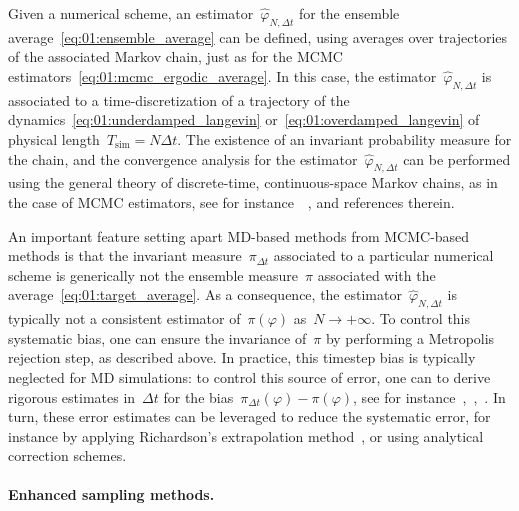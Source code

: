 Given a numerical scheme, an estimator~$\widehat{\varphi}_{N,\Delta t}$ for the ensemble average~\eqref{eq:01:ensemble_average} can be defined, using averages over trajectories of the associated Markov chain, just as for the MCMC estimators~\eqref{eq:01:mcmc_ergodic_average}.
In this case, the estimator~$\widehat{\varphi}_{N,\Delta t}$ is associated to a time-discretization of a trajectory of the dynamics~\eqref{eq:01:underdamped_langevin} or~\eqref{eq:01:overdamped_langevin} of physical length~$T_{\mathrm{sim}}=N\Delta t$.
The existence of an invariant probability measure for the chain, and the convergence analysis for the estimator~$\widehat{\varphi}_{N,\Delta t}$ can be performed using the general theory of discrete-time, continuous-space Markov chains, as in the case of MCMC estimators, see for instance~\cite[Section 6]{MSH02}~\cite{LMS16}, and references therein.

An important feature setting apart MD-based methods from MCMC-based methods is that the invariant measure~$\pi_{\Delta t}$ associated to a particular numerical scheme is generically not the ensemble measure~$\pi$ associated with the average~\eqref{eq:01:target_average}.
As a consequence, the estimator~$\widehat{\varphi}_{N,\Delta t}$ is typically not a consistent estimator of~$\pi(\varphi)$ as~$N\to +\infty$.
To control this systematic bias, one can ensure the invariance of~$\pi$ by performing a Metropolis rejection step, as described above. In practice, this timestep bias is typically neglected for MD simulations: to control this source of error, one can to derive rigorous estimates in~$\Delta t$ for the bias~$\pi_{\Delta t}(\varphi)-\pi(\varphi)$, see for instance~\cite{TT90},~\cite[Section 3.2.3]{LS16},~\cite[Section 2.4]{LMS16}.
In turn, these error estimates can be leveraged to reduce the systematic error, for instance by applying Richardson's extrapolation method~\cite{R11}, or using analytical correction schemes.




\paragraph{Enhanced sampling methods.}

